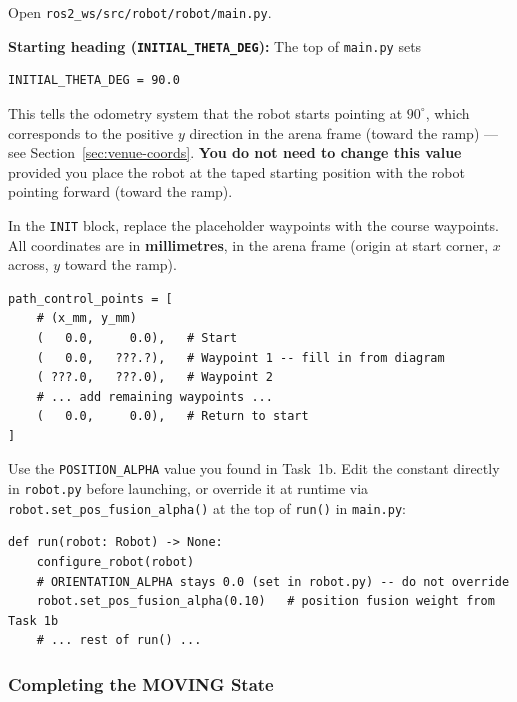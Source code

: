 \documentclass[12pt,letterpaper]{article}
\begin{document}
Open \texttt{ros2\_ws/src/robot/robot/main.py}.

\begin{notebox}
  \textbf{Starting heading (\texttt{INITIAL\_THETA\_DEG}):}
  The top of \texttt{main.py} sets
\begin{lstlisting}[style=python]
INITIAL_THETA_DEG = 90.0
\end{lstlisting}
  This tells the odometry system that the robot starts pointing at $90^\circ$,
  which corresponds to the positive $y$ direction in the arena frame (toward
  the ramp) --- see Section~\ref{sec:venue-coords}.
  \textbf{You do not need to change this value} provided you place the robot at
  the taped starting position with the robot pointing forward (toward the ramp).
\end{notebox}

In the \texttt{INIT} block, replace the placeholder waypoints with the course waypoints.
All coordinates are in \textbf{millimetres}, in the arena frame
(origin at start corner, $x$ across, $y$ toward the ramp).

\begin{lstlisting}[style=python, caption={Obstacle course waypoints in main.py (fill in from the course diagram)}]
path_control_points = [
    # (x_mm, y_mm)
    (   0.0,     0.0),   # Start
    (   0.0,   ???.?),   # Waypoint 1 -- fill in from diagram
    ( ???.0,   ???.0),   # Waypoint 2
    # ... add remaining waypoints ...
    (   0.0,     0.0),   # Return to start
]
\end{lstlisting}

\begin{notebox}
  Use the \texttt{POSITION\_ALPHA} value you found in Task~1b.
  Edit the constant directly in \texttt{robot.py} before launching, or
  override it at runtime via \texttt{robot.set\_pos\_fusion\_alpha()} at the
  top of \texttt{run()} in \texttt{main.py}:
\begin{lstlisting}[style=python]
def run(robot: Robot) -> None:
    configure_robot(robot)
    # ORIENTATION_ALPHA stays 0.0 (set in robot.py) -- do not override
    robot.set_pos_fusion_alpha(0.10)   # position fusion weight from Task 1b
    # ... rest of run() ...
\end{lstlisting}
\end{notebox}

\subsubsection{Completing the MOVING State}
\end{document}
